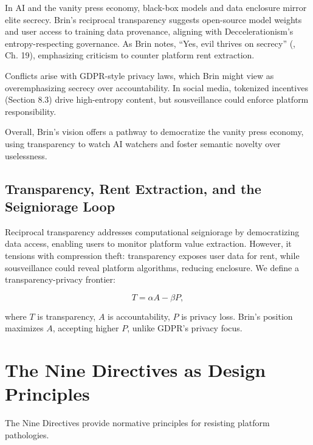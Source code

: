\documentclass[12pt]{article}
\begin{document}
In AI and the vanity press economy, black-box models and data enclosure mirror elite secrecy. Brin's reciprocal transparency suggests open-source model weights and user access to training data provenance, aligning with Deccelerationism's entropy-respecting governance. As Brin notes, ``Yes, evil thrives on secrecy'' (\citealp{Brin1998}, Ch. 19), emphasizing criticism to counter platform rent extraction.

Conflicts arise with GDPR-style privacy laws, which Brin might view as overemphasizing secrecy over accountability. In social media, tokenized incentives (Section 8.3) drive high-entropy content, but sousveillance could enforce platform responsibility.

Overall, Brin's vision offers a pathway to democratize the vanity press economy, using transparency to watch AI watchers and foster semantic novelty over uselessness.

\subsection{Transparency, Rent Extraction, and the Seigniorage Loop}

Reciprocal transparency addresses computational seigniorage by democratizing data access, enabling users to monitor platform value extraction. However, it tensions with compression theft: transparency exposes user data for rent, while sousveillance could reveal platform algorithms, reducing enclosure. We define a transparency-privacy frontier:

\[
T = \alpha A - \beta P,
\]

where \( T \) is transparency, \( A \) is accountability, \( P \) is privacy loss. Brin's position maximizes \( A \), accepting higher \( P \), unlike GDPR's privacy focus.

\section{The Nine Directives as Design Principles}

The Nine Directives provide normative principles for resisting platform pathologies.
\end{document}
